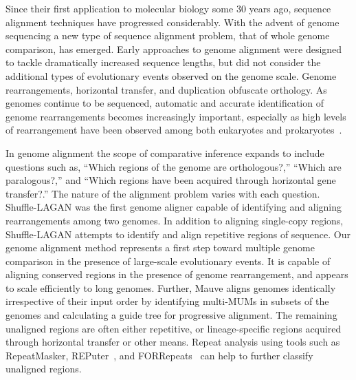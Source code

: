 \documentclass[titlepage,11pt]{article}
\begin{document}
Since their first application to molecular biology some 30 years ago, sequence
alignment techniques have progressed considerably.  With the advent of genome
sequencing a new type of sequence alignment problem, that of whole genome
comparison, has emerged.  Early approaches to genome alignment were designed to
tackle dramatically increased sequence lengths, but did not consider the
additional types of evolutionary events observed on the genome scale.  Genome
rearrangements, horizontal transfer, and duplication obfuscate
orthology.  As genomes continue to be sequenced,
automatic and accurate identification of genome rearrangements becomes
increasingly important, especially as high levels of rearrangement have been
observed among both eukaryotes and
prokaryotes~\citep{mammal_breakpoints,single_gene_inversions,grimm}.



In genome alignment the scope of
comparative inference expands to include questions such as, ``Which regions of
the genome are orthologous?,'' ``Which are paralogous?,'' and ``Which regions
have been acquired through horizontal gene transfer?.''  The nature of the
alignment problem varies with each question.  Shuffle-LAGAN was the first genome
aligner capable of identifying and aligning rearrangements among two genomes.
In addition to aligning single-copy regions, Shuffle-LAGAN attempts to
identify and align repetitive regions of sequence.  Our genome alignment method
represents a first step toward multiple genome
comparison in the presence of large-scale evolutionary events.  It is
capable of aligning conserved regions in the presence of genome
rearrangement, and appears to scale efficiently to long genomes. 
Further, Mauve
aligns genomes identically irrespective of their input order by identifying
multi-MUMs in subsets of the genomes and calculating a guide tree for
progressive alignment.
The remaining unaligned regions are often either repetitive, or lineage-specific
regions acquired through horizontal transfer or other means.  Repeat analysis using tools such as
RepeatMasker,  REPuter~\citep{reputer}, and FORRepeats~\citep{forrepeats} can
help to further classify unaligned regions.

\end{document}
